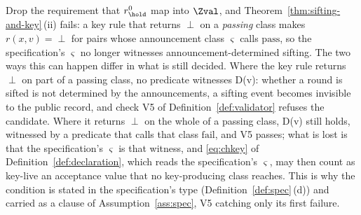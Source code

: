 
\begin{remark}\label{rem:sidecond}
Drop the requirement that $r^{0}_{\hold}$ map into $\Zval$, and
Theorem~\ref{thm:sifting-and-key}\,(ii) fails: a key rule that returns $\perp$
on a \emph{passing} class makes $r(x,v)=\perp$ for pairs whose announcement
class $\varsigma$ calls $\mathrm{pass}$, so the specification's $\varsigma$ no
longer witnesses announcement-determined sifting. The two ways this can happen
differ in what is still decided. Where the key rule returns $\perp$ on part of
a passing class, no predicate witnesses D(v): whether a round is sifted is not
determined by the announcements, a sifting event becomes invisible to the
public record, and check V5 of Definition~\ref{def:validator} refuses the
candidate. Where it returns $\perp$ on the whole of a passing class, D(v) still
holds, witnessed by a predicate that calls that class $\mathrm{fail}$, and V5
passes; what is lost is that the specification's $\varsigma$ is that witness,
and \eqref{eq:chkey} of Definition~\ref{def:declaration}, which reads the
specification's $\varsigma$, may then count as key-live an acceptance value
that no key-producing class reaches. This is why the condition is stated in
the specification's type (Definition~\ref{def:spec}\,(d)) and carried as a
clause of Assumption~\ref{ass:spec}, V5 catching only its first failure.
\end{remark}
